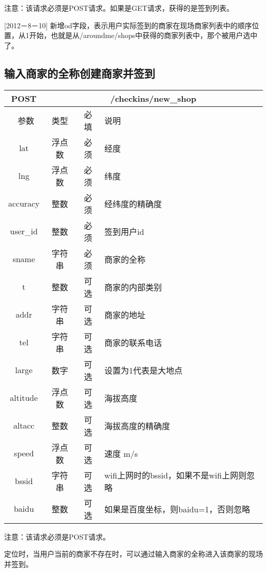 \documentclass[cs4size]{ctexartutf8}
\begin{document}
注意：该请求必须是POST请求。如果是GET请求，获得的是签到列表。

[2012－8－10] 新增od字段，表示用户实际签到的商家在现场商家列表中的顺序位置，从1开始，也就是从/aroundme/shops中获得的商家列表中，那个被用户选中了。



\subsection{输入商家的全称创建商家并签到}

\begin{table}[H]
   \begin{center}
\begin{tabular}{|c|c|c|p{12cm}|}
\hline
POST & \multicolumn{3}{|c|}{/checkins/new\_shop} \\
\hline\hline
 \  参数  & 类型 & 必填 &  说明  \\
\hline
 lat  & 浮点数 & 必须 & 经度\\
\hline
 lng  &  浮点数 & 必须 & 纬度\\ 
\hline
 accuracy  & 整数 & 必须 & 经纬度的精确度\\ 
\hline
 user\_id  & 整数 & 必须 &  签到用户id\\ 
\hline
 sname  & 字符串 & 必须 &  商家的全称\\  
\hline
 t  & 整数 & 可选 &  商家的内部类别\\    
\hline
 addr  & 字符串 & 可选 &  商家的地址\\   
 \hline
 tel  & 字符串 & 可选 &  商家的联系电话\\    
 \hline
 large  & 数字 & 可选 &  设置为1代表是大地点\\     
\hline
 altitude  &  浮点数 & 可选 & 海拔高度\\ 
\hline
 altacc  & 整数 & 可选 & 海拔高度的精确度\\  
 \hline
 speed  & 浮点数 & 可选 & 速度 m/s\\   
\hline
 bssid  & 字符串 & 可选 & wifi上网时的bssid，如果不是wifi上网则忽略\\  
 \hline
 baidu  & 整数 & 可选 & 如果是百度坐标，则baidu=1，否则忽略\\  
\hline
\end{tabular}
   \end{center}
\end{table}

注意：该请求必须是POST请求。

定位时，当用户当前的商家不存在时，可以通过输入商家的全称进入该商家的现场并签到。
\end{document}
